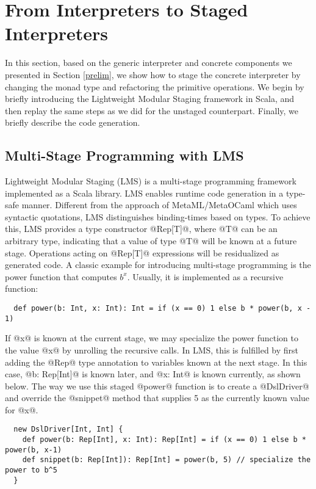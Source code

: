 \section{From Interpreters to Staged Interpreters} \label{stagedinterp}

In this section, based on the generic interpreter and concrete components we
presented in Section \ref{prelim}, we show how to stage the concrete
interpreter by changing the monad type and refactoring the primitive
operations. We begin by briefly introducing the Lightweight Modular Staging
framework in Scala, and then replay the same steps as we did for the unstaged
counterpart. Finally, we briefly describe the code generation.

\subsection{Multi-Stage Programming with LMS}

Lightweight Modular Staging (LMS) \cite{DBLP:conf/gpce/RompfO10} is a
multi-stage programming framework implemented as a Scala library. LMS enables
runtime code generation in a type-safe manner. Different from the approach of
MetaML/MetaOCaml \cite{DBLP:conf/flops/Kiselyov14, DBLP:conf/gpce/CalcagnoTHL03} which
uses syntactic quotations, LMS distinguishes binding-times based on types. 
To achieve this, LMS provides a type constructor @Rep[T]@, where @T@ can be an
arbitrary type, indicating that a value of type @T@ will be known at a future
stage.  Operations acting on @Rep[T]@ expressions will be residualized as
generated code.
A classic example for introducing multi-stage programming is the power function
that computes $b^x$. Usually, it is implemented as a recursive function:
\begin{lstlisting}
  def power(b: Int, x: Int): Int = if (x == 0) 1 else b * power(b, x - 1)
\end{lstlisting}

If @x@ is known at the current stage, we may specialize the power function to
the value @x@ by unrolling the recursive calls. In LMS, this is fulfilled by
first adding the @Rep@ type annotation to variables known at the next stage. In this case,
@b: Rep[Int]@ is known later, and @x: Int@ is known currently, as shown below.
The way we use this staged @power@ function is to create a @DslDriver@ and override the
@snippet@ method that supplies 5 as the currently known value for @x@.
\begin{lstlisting}
  new DslDriver[Int, Int] {
    def power(b: Rep[Int], x: Int): Rep[Int] = if (x == 0) 1 else b * power(b, x-1)
    def snippet(b: Rep[Int]): Rep[Int] = power(b, 5) // specialize the power to b^5
  }
\end{lstlisting}

